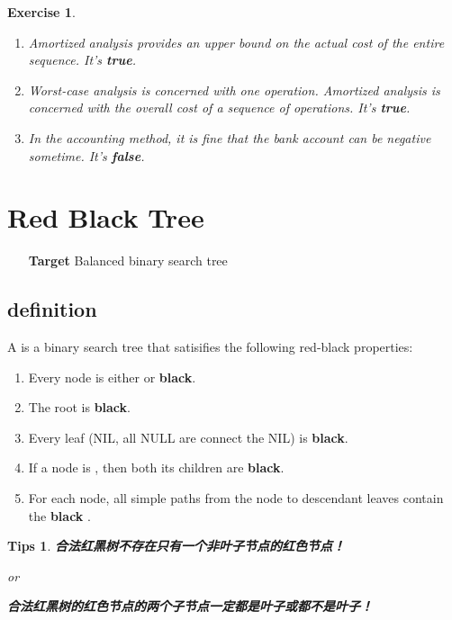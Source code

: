 \documentclass{article}
\newtheorem*{Tips}{Tips}
\newtheorem*{Exercise}{Exercise}
\begin{document}
\begin{Exercise}
    \begin{enumerate}
        \item Amortized analysis provides an upper bound on the actual cost of the entire sequence. 
        It's \textbf{true}.
        \item Worst-case analysis is concerned with one operation. Amortized analysis is concerned with the overall cost of a sequence of operations. 
        It's \textbf{true}.
        \item In the accounting method, it is fine that the bank account can be negative sometime. 
        It's \textbf{false}.
    \end{enumerate}
\end{Exercise}
\newpage

\section{Red Black Tree}
\hypertarget{Red Black}{}
\begin{itemize}
    \item [\textbf{Target}] Balanced binary search tree
\end{itemize}

\subsection{definition}
A {\color{blue}{red-black tree}} is a binary search tree that satisifies the following red-black properties:
\begin{enumerate}
    \item Every node is either {\color{red}{red}} or \textbf{black}. 
    \item The root is \textbf{black}. 
    \item Every leaf (NIL, all NULL are connect the NIL) is \textbf{black}. 
    \item If a node is {\color{red}{red}}, then both its children are \textbf{black}. 
    \item For each node, all simple paths from the node to descendant leaves contain the {\color{red}{same number of}} \textbf{black} {\color{red}{nodes}}. 
\end{enumerate}

\begin{Tips}
    \textbf{合法红黑树不存在只有一个非叶子节点的红色节点！}
    \par or \par
    \textbf{合法红黑树的红色节点的两个子节点一定都是叶子或都不是叶子！}
\end{Tips}
\end{document}
